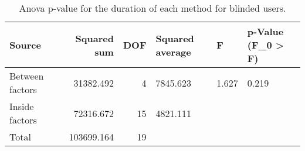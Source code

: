 
\begin{table}[!htb]
\centering
\caption{Anova p-value for the duration of each method for blinded users.}
\label{tab:anova_duration}
\begin{tabular}{lrrlll}
\toprule
         Source &  Squared sum &  DOF & Squared average &     F & p-Value (F\_0 > F) \\
\midrule
Between factors &    31382.492 &    4 &        7845.623 & 1.627 &             0.219 \\
 Inside factors &    72316.672 &   15 &        4821.111 &       &                   \\
          Total &   103699.164 &   19 &                 &       &                   \\
\bottomrule
\end{tabular}
\end{table}

